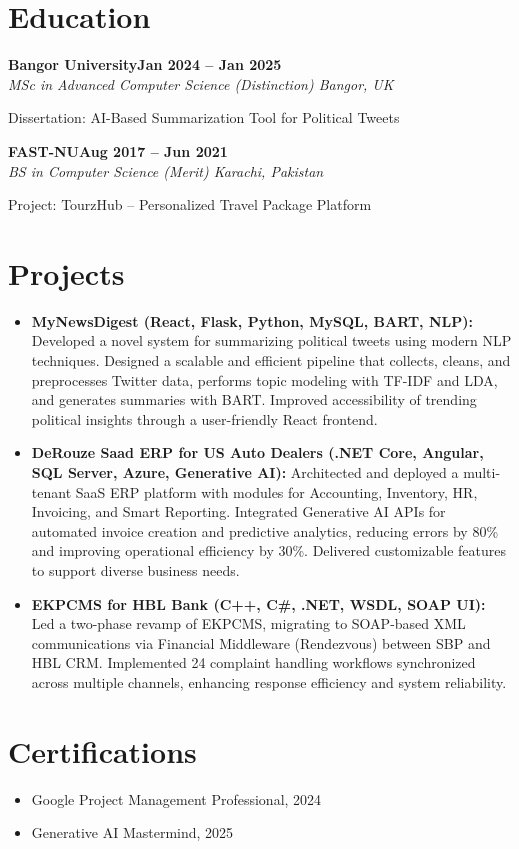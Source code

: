 \documentclass[letterpaper,10pt]{article}
\newcommand{\headingBf}[2]{
  \hspace{10pt}\textbf{#1}\hfill\textbf{#2}\\
}
\newcommand{\headingIt}[2]{
  \hspace{10pt}\textit{#1}\hfill\textit{#2}\\
}
\newenvironment{resume_list}{
  \vspace{-7pt}
  \begin{itemize}[itemsep=-2px, parsep=1pt, leftmargin=30pt]
}{
  \end{itemize}
}
\begin{document}
\section{Education}

\headingBf{Bangor University}{Jan 2024 -- Jan 2025}
\headingIt{MSc in Advanced Computer Science (Distinction) \hfill Bangor, UK}{}
\begin{resume_list}
    \item Dissertation: AI-Based Summarization Tool for Political Tweets
\end{resume_list}

\headingBf{FAST-NU}{Aug 2017 -- Jun 2021}
\headingIt{BS in Computer Science (Merit) \hfill Karachi, Pakistan}{}
\begin{resume_list}
    \item Project: TourzHub -- Personalized Travel Package Platform
\end{resume_list}

\section{Projects}
\begin{itemize}
    \setlength\itemsep{3pt}
    \item \textbf{MyNewsDigest (React, Flask, Python, MySQL, BART, NLP):} Developed a novel system for summarizing political tweets using modern NLP techniques. Designed a scalable and efficient pipeline that collects, cleans, and preprocesses Twitter data, performs topic modeling with TF-IDF and LDA, and generates summaries with BART. Improved accessibility of trending political insights through a user-friendly React frontend.
    \item \textbf{DeRouze Saad ERP for US Auto Dealers (.NET Core, Angular, SQL Server, Azure, Generative AI): } Architected and deployed a multi-tenant SaaS ERP platform with modules for Accounting, Inventory, HR, Invoicing, and Smart Reporting. Integrated Generative AI APIs for automated invoice creation and predictive analytics, reducing errors by 80\% and improving operational efficiency by 30\%. Delivered customizable features to support diverse business needs.
    \item \textbf{EKPCMS for HBL Bank (C++, C\#, .NET, WSDL, SOAP UI):} Led a two-phase revamp of EKPCMS, migrating to SOAP-based XML communications via Financial Middleware (Rendezvous) between SBP and HBL CRM. Implemented 24 complaint handling workflows synchronized across multiple channels, enhancing response efficiency and system reliability.
\end{itemize}

\section{Certifications}
\begin{itemize}
    \item Google Project Management Professional, 2024
    \item Generative AI Mastermind, 2025
\end{itemize}

\vspace*{\fill}
\end{document}
